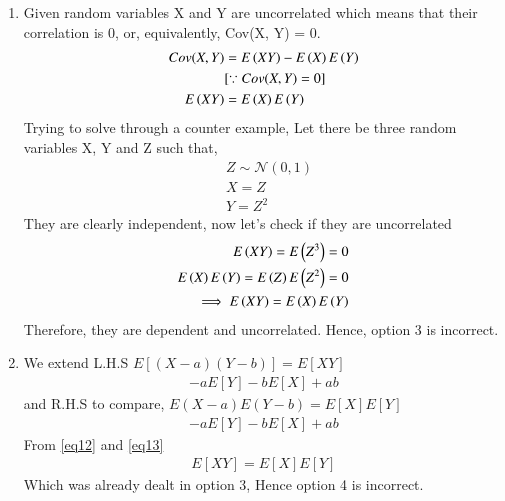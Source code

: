 \documentclass[journal,12pt,twocolumn]{IEEEtran}
\begin{document}
\begin{enumerate}
\item Given random variables X and Y are uncorrelated which means that their correlation is 0, or, equivalently, Cov(X, Y) = 0.
\begin{align}
    Cov(X, Y) &= E\left(XY\right) - E\left(X\right)E\left(Y\right)\\
    &[\because Cov(X, Y) = 0]\\
    E\left(XY\right) &= E\left(X\right)E\left(Y\right)
\end{align}
Trying to solve through a counter example,
Let there be three random variables X, Y and Z such that,
\begin{align}
    &Z \sim \mathcal{N}(0, 1)\\
    &X = Z\\
    &Y = Z^2
\end{align}
They are clearly independent, now let's check if they are uncorrelated
\begin{align}
  E\left(XY\right) = E\left(Z^3\right) = 0\\
  E\left(X\right)E\left(Y\right) = E\left(Z\right)E\left(Z^2\right) = 0\\
  \implies E\left(XY\right) = E\left(X\right)E\left(Y\right)
\end{align}
Therefore, they are dependent and uncorrelated. Hence, option 3 is incorrect.
\item We extend L.H.S
\begin{math}
    E[(X-a)(Y-b)] = E[XY]
\end{math}
\begin{align}
    - aE[Y] - bE[X] + ab\label{eq12}
\end{align}
and R.H.S to compare,
\begin{math}
    E(X-a) E(Y-b) = E[X]E[Y]
\end{math}
\begin{align}
    - aE[Y] - bE[X] + ab\label{eq13}
\end{align}
From \eqref{eq12} and \eqref{eq13}
\begin{align}
    E[XY] = E[X] E[Y]
\end{align}
 Which was already dealt in option 3, Hence option 4 is incorrect.
\end{enumerate}
\end{document}

